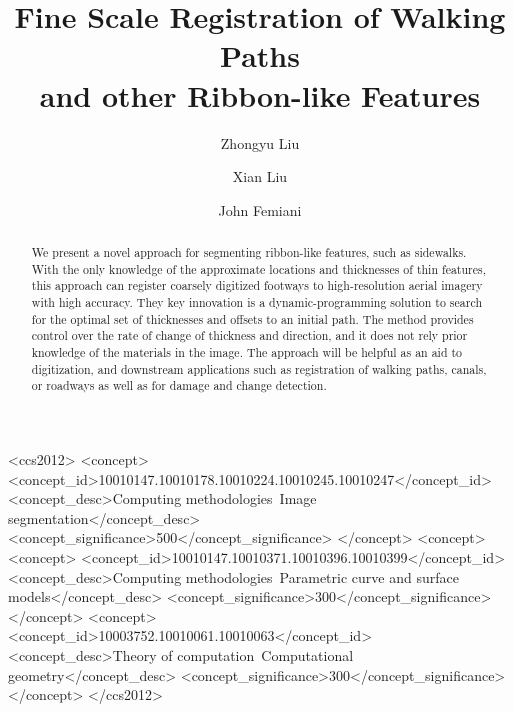 \documentclass[sigconf]{acmart}
\begin{document}
\title[Fine Scale Registration of Ribbon-like Features]{Fine Scale Registration of Walking Paths \\and other Ribbon-like Features}


\author{Zhongyu Liu}

\author{Xian Liu}


\author{John Femiani}




\begin{abstract}
	We present a novel approach for segmenting ribbon-like features, such as sidewalks.
	With the only knowledge of the approximate locations and thicknesses of thin features, this approach can register coarsely digitized footways to high-resolution aerial imagery with high accuracy. 
	They key innovation is a dynamic-programming solution to search for the optimal set of thicknesses and offsets to an initial path. The method provides control over the rate of change of thickness and direction, and it does not rely prior knowledge of the materials in the image.
   The approach will be helpful as an aid to digitization, and  downstream applications such as registration of walking paths, canals, or roadways as well as for damage and change detection.
\end{abstract}

%
%
\begin{CCSXML}
<ccs2012>
<concept>
<concept_id>10010147.10010178.10010224.10010245.10010247</concept_id>
<concept_desc>Computing methodologies~Image segmentation</concept_desc>
<concept_significance>500</concept_significance>
</concept>
<concept>
<concept>
<concept_id>10010147.10010371.10010396.10010399</concept_id>
<concept_desc>Computing methodologies~Parametric curve and surface models</concept_desc>
<concept_significance>300</concept_significance>
</concept>
<concept>
<concept_id>10003752.10010061.10010063</concept_id>
<concept_desc>Theory of computation~Computational geometry</concept_desc>
<concept_significance>300</concept_significance>
</concept>
</ccs2012>
\end{CCSXML}
\end{document}
